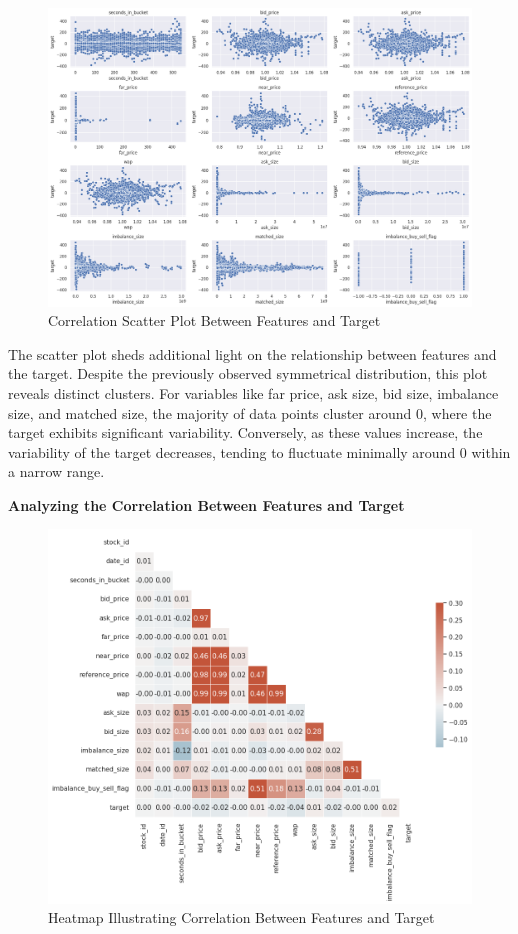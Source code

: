 \documentclass[12pt]{article}
\newtheorem{Proof of Lemma}{Proof of Lemma}
\begin{document}
\begin{figure}[H]
  \centering
  \includegraphics[width=1\linewidth]{images/Scatter.png}
  \caption{Correlation Scatter Plot Between Features and Target}
  \label{fig:FeatureTargetCorrelationScatter}
\end{figure}

The scatter plot sheds additional light on the relationship between features and the target. Despite the previously observed symmetrical distribution, this plot reveals distinct clusters. For variables like far price, ask size, bid size, imbalance size, and matched size, the majority of data points cluster around 0, where the target exhibits significant variability. Conversely, as these values increase, the variability of the target decreases, tending to fluctuate minimally around 0 within a narrow range.

\noindent \textbf{Analyzing the Correlation Between Features and Target}

\begin{figure}[H]
  \centering
  \includegraphics[width=1\linewidth]{images/CorrHeatMap.png}
  \caption{Heatmap Illustrating Correlation Between Features and Target}
  \label{fig:FeatureTargetCorrelationHeatmap}
\end{figure}
\end{document}
